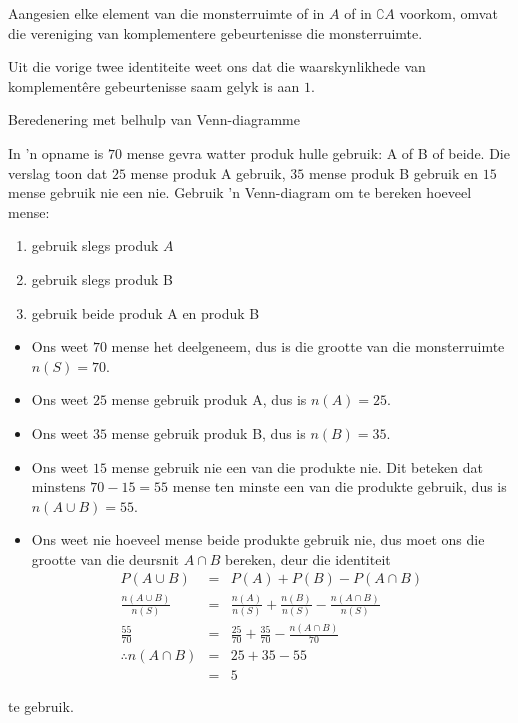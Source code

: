 
Aangesien elke element van die monsterruimte of in $A$ of in $\complement{A}$ voorkom, omvat die vereniging van komplementere gebeurtenisse die monsterruimte.

Uit die vorige twee identiteite weet ons dat die waarskynlikhede van komplement\^ere gebeurtenisse saam gelyk is aan $1$.


\begin{wex}{Beredenering met belhulp van Venn-diagramme}{
  In 'n opname is $70$ mense gevra watter produk hulle gebruik: A of B of beide. Die verslag toon dat $25$ mense produk A gebruik, $35$ mense produk B gebruik en $15$ mense gebruik nie een nie. Gebruik 'n Venn-diagram om te bereken hoeveel mense:
  \begin{enumerate}[itemsep=5pt, label=\textbf{\arabic*}]
\item gebruik slegs produk $A$
  \item gebruik slegs produk B
  \item gebruik beide produk A en produk B
  \end{enumerate}
}{
  \begin{itemize}
  \item Ons weet $70$ mense het deelgeneem, dus is die grootte van die monsterruimte $n(S) = 70$.
  \item Ons weet $25$ mense gebruik produk A, dus is $n(A) = 25$.
  \item Ons weet $35$ mense gebruik produk B, dus is $n(B) = 35$.
  \item Ons weet $15$ mense gebruik nie een van die produkte nie. Dit beteken dat minstens $70-15=55$ mense ten minste een van die produkte gebruik, dus is 
    $n(A \cup B) = 55$.
  \item Ons weet nie hoeveel mense beide produkte gebruik nie, dus moet ons die grootte van die deursnit $A \cap B$ bereken, deur die identiteit
    \begin{eqnarray*}
      P(A \cup B) & = & P(A) + P(B) - P(A \cap B) \\
      \frac{n(A \cup B)}{n(S)} & = & \frac{n(A)}{n(S)} + \frac{n(B)}{n(S)} - \frac{n(A \cap B)}{n(S)} \\
      \frac{55}{70} & = & \frac{25}{70} + \frac{35}{70} - \frac{n(A \cap B)}{70} \\
      \therefore n(A \cap B) & = & 25 + 35 - 55 \\
      & = & 5
    \end{eqnarray*}
  \end{itemize}
te gebruik.

}
\end{wex}
